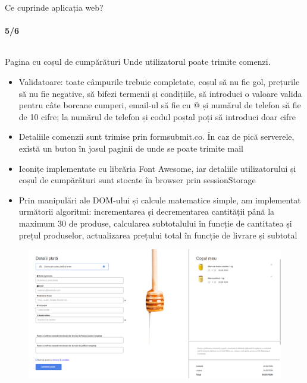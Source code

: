 \documentclass{beamer}
\begin{document}
\begin{darkframes}
		\begin{frame}[label=math]{Ce cuprinde aplicația web?}
			\vspace{-1em}
			\framesubtitle{5/6}
			\begin{columns}[t]
				\begin{column}{1\textwidth}
					\begin{exampleblock}{Pagina cu coșul de cumpărături}
						\tiny
						Unde utilizatorul poate \alert{trimite comenzi.}
						\begin{itemize}
							\item \alert{Validatoare}: toate câmpurile trebuie completate, coșul să nu fie gol, prețurile să nu fie negative, să bifezi termenii și condițiile, să introduci o valoare valida pentru câte borcane cumperi, email-ul să fie cu @ și numărul de telefon să fie de 10 cifre; la numărul de telefon și codul poștal poți să introduci doar cifre
							\item Detaliile comenzii sunt trimise prin \alert{formsubmit.co}. În caz de pică serverele, există un buton în josul paginii de unde se poate trimite mail
							\item Iconițe implementate cu librăria \alert{Font Awesome}, iar detaliile utilizatorului și coșul de cumpărături sunt stocate în browser prin \alert{sessionStorage}
							\item Prin manipulări ale DOM-ului și \alert{calcule matematice} simple, am implementat următorii \alert{algoritmi}: incrementarea și decrementarea cantității până la maximum 30 de produse, calcularea subtotalului în funcție de cantitatea și prețul produselor, actualizarea prețului total în funcție de livrare și subtotal
						\end{itemize}
					\end{exampleblock}
					\vspace{-1em}
					\begin{figure}[!tbp]
						\centering
						\begin{minipage}[b]{0.45\textwidth}
							\includegraphics[width=\textwidth]{shop.png}
						\end{minipage}
						\hfill
					\end{figure}
				\end{column}
			\end{columns}
		\end{frame}
		

\end{darkframes}
\end{document}
